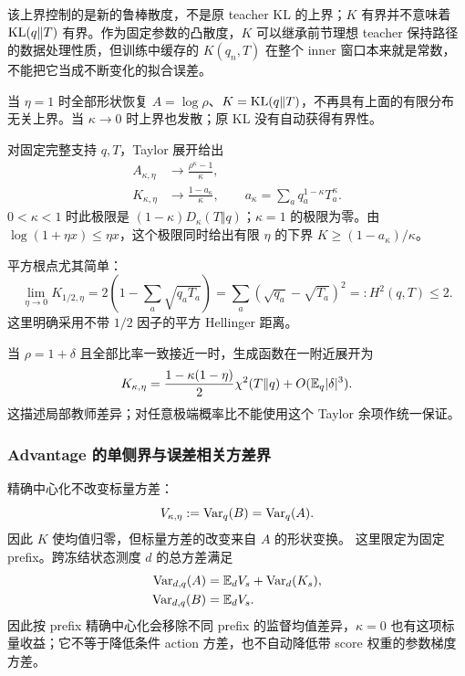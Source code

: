 该上界控制的是新的鲁棒散度，不是原 teacher KL 的上界；$K$ 有界并不意味着 $\operatorname{KL}(q\Vert T)$ 有界。作为固定参数的凸散度，$K$ 可以继承前节理想 teacher 保持路径的数据处理性质，但训练中缓存的 $K(q_n,T)$ 在整个 inner 窗口本来就是常数，不能把它当成不断变化的拟合误差。

当 $\eta=1$ 时全部形状恢复 $A=\log\rho$、$K=\operatorname{KL}(q\Vert T)$，不再具有上面的有限分布无关上界。当 $\kappa\to0$ 时上界也发散；原 KL 没有自动获得有界性。

对固定完整支持 $q,T$，Taylor 展开给出
\begin{align}
 A_{\kappa,\eta}&\longrightarrow\frac{\rho^\kappa-1}{\kappa},\\
 K_{\kappa,\eta}&\longrightarrow
 \frac{1-a_\kappa}{\kappa},\qquad
 a_\kappa=\sum_aq_a^{1-\kappa}T_a^\kappa.
 \label{eq:center-small-step-limit}
\end{align}
$0<\kappa<1$ 时此极限是 $(1-\kappa)D_\kappa(T\Vert q)$；$\kappa=1$ 的极限为零。由 $\log(1+\eta x)\le\eta x$，这个极限同时给出有限 $\eta$ 的下界 $K\ge(1-a_\kappa)/\kappa$。

平方根点尤其简单：
\begin{equation}
 \lim_{\eta\to0}K_{1/2,\eta}
 =2\left(1-\sum_a\sqrt{q_aT_a}\right)
 =\sum_a(\sqrt{q_a}-\sqrt{T_a})^2=:H^2(q,T)\le2.
\end{equation}
这里明确采用不带 $1/2$ 因子的平方 Hellinger 距离。

当 $\rho=1+\delta$ 且全部比率一致接近一时，生成函数在一附近展开为
\begin{equation}
 K_{\kappa,\eta}
 =\frac{1-\kappa(1-\eta)}2\chi^2(T\Vert q)
  +O(\mathbb E_q|\delta|^3).
\end{equation}
这描述局部教师差异；对任意极端概率比不能使用这个 Taylor 余项作统一保证。

\subsubsection{Advantage 的单侧界与误差相关方差界}

精确中心化不改变标量方差：
\begin{equation}
 V_{\kappa,\eta}:=\operatorname{Var}_q(B)=\operatorname{Var}_q(A).
\end{equation}
因此 $K$ 使均值归零，但标量方差的改变来自 $A$ 的形状变换。 这里限定为固定 prefix。跨冻结状态测度 $d$ 的总方差满足
\begin{align}
 \operatorname{Var}_{d,q}(A)&=\mathbb E_dV_s+\operatorname{Var}_d(K_s),\\
 \operatorname{Var}_{d,q}(B)&=\mathbb E_dV_s.
\end{align}
因此按 prefix 精确中心化会移除不同 prefix 的监督均值差异，$\kappa=0$ 也有这项标量收益；它不等于降低条件 action 方差，也不自动降低带 score 权重的参数梯度方差。

